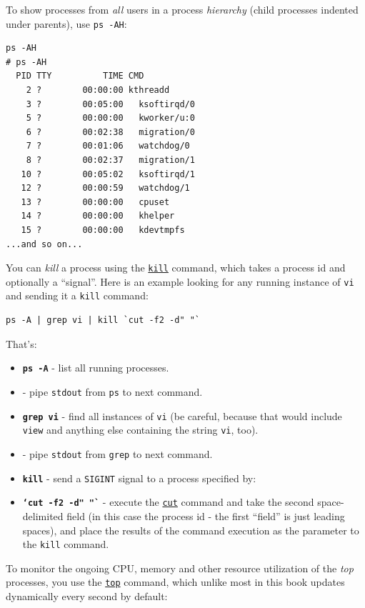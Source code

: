 \documentclass[10pt,]{book}
\numberwithin{figure}{chapter}
\begin{document}
To show processes from \emph{all} users in a process \emph{hierarchy}
(child processes indented under parents), use \texttt{ps -AH}:

\begin{verbatim}
ps -AH
# ps -AH
  PID TTY          TIME CMD
    2 ?        00:00:00 kthreadd
    3 ?        00:05:00   ksoftirqd/0
    5 ?        00:00:00   kworker/u:0
    6 ?        00:02:38   migration/0
    7 ?        00:01:06   watchdog/0
    8 ?        00:02:37   migration/1
   10 ?        00:05:02   ksoftirqd/1
   12 ?        00:00:59   watchdog/1
   13 ?        00:00:00   cpuset
   14 ?        00:00:00   khelper
   15 ?        00:00:00   kdevtmpfs
...and so on...
\end{verbatim}

You can \emph{kill} a process using the
\href{http://linux.die.net/man/1/kill}{\texttt{kill}} command, which
takes a process id and optionally a ``signal''. Here is an example
looking for any running instance of \texttt{vi} and sending it a
\texttt{kill} command:

\begin{verbatim}
ps -A | grep vi | kill `cut -f2 -d" "`
\end{verbatim}

That's:

\begin{itemize}
\item
  \textbf{\texttt{ps -A}} - list all running processes.
\item
  \textbf{\texttt{\textbar{}}} - pipe \texttt{stdout} from \texttt{ps}
  to next command.
\item
  \textbf{\texttt{grep vi}} - find all instances of \texttt{vi} (be
  careful, because that would include \texttt{view} and anything else
  containing the string \texttt{vi}, too).
\item
  \textbf{\texttt{\textbar{}}} - pipe \texttt{stdout} from \texttt{grep}
  to next command.
\item
  \textbf{\texttt{kill}} - send a \texttt{SIGINT} signal to a process
  specified by:
\item
  \textbf{\texttt{`cut -f2 -d" "`}} - execute the
  \href{http://linux.die.net/man/1/cut}{\texttt{cut}} command and take
  the second space-delimited field (in this case the process id - the
  first ``field'' is just leading spaces), and place the results of the
  command execution as the parameter to the \texttt{kill} command.
\end{itemize}

To monitor the ongoing CPU, memory and other resource utilization of the
\emph{top} processes, you use the
\href{http://linux.die.net/man/1/top}{\texttt{top}} command, which
unlike most in this book updates dynamically every second by default:
\end{document}
